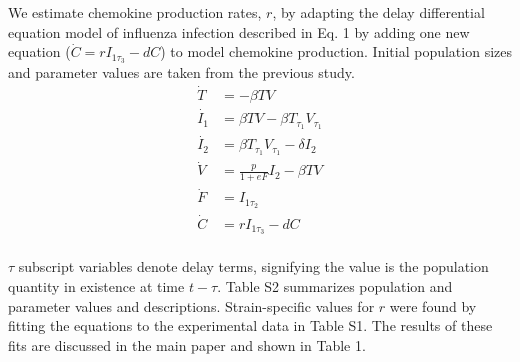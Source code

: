 \documentclass[10pt]{article}
\begin{document}
We estimate chemokine production rates, $r$, by adapting the delay differential equation model of influenza infection described in \cite{Mitchell2011} Eq. 1 by adding one new equation ($\dot{C}=r I_{1 \tau_3}-dC$) to model chemokine production.  Initial population sizes and parameter values are taken from the previous study.
{\footnotesize
\begin{equation*}
\begin{aligned}
\dot{T} &= - \beta T V \\
\dot{I_1} &= \beta T V - \beta T_{\tau_1}V_{\tau_1} \\
\dot{I_2} &= \beta T_{\tau_1}V_{\tau_1} - \delta I_2 \\
\dot{V} &= \frac{p}{1+eF} I_2  - \beta T V  \\
\dot{F} &=  I_{1 \tau_2} \\
\dot{C} &= r I_{1 \tau_3} - d C \\
\end{aligned}
\tag{S1}
\label{eq:dde}
\end{equation*}
\vspace{.05in}
}

$\tau$ subscript variables denote delay terms, signifying the value is the population quantity in existence at time $t - \tau$.  Table S2 summarizes population and parameter values and descriptions.  Strain-specific values for $r$ were found by fitting the equations to the experimental data in Table S1.  The results of these fits are discussed in the main paper and shown in Table 1.



\end{document}
